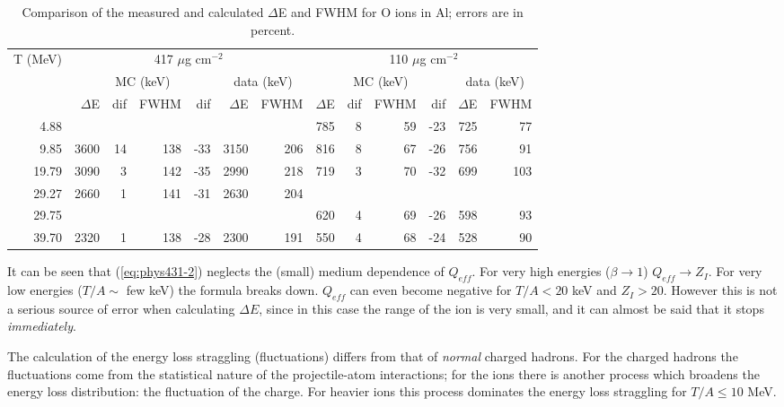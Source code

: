 \begin{table}
\begin{centering}
\begin{tabular}{|r|rr|rr|r|r|rr|rr|r|r|}
\hline
\multicolumn{1}{|c|}{T (MeV)} & \multicolumn{6}{c|}{417 $\mu$g cm$^{-2}$}
& \multicolumn{6}{c|}{110 $\mu$g cm$^{-2}$} \\[0.1cm]
& \multicolumn{4}{c|}{MC (keV)} & \multicolumn{2}{c|}{data (keV)} &
\multicolumn{4}{c|}{MC (keV)} & \multicolumn{2}{c|}{data (keV)} \\
& $\Delta$E & dif & FWHM & dif & $\Delta$E & FWHM & 
$\Delta$E & dif & FWHM & dif & $\Delta$E & FWHM \\
\hline
4.88  & &  & & & & & 785 & 8 & 59 & -23 & 725 & 77 \\
9.85 & 3600 & 14 & 138 & -33 & 3150 & 206 & 816 & 8 & 67 &  -26 & 756 & 91 \\
19.79 & 3090 & 3 & 142 & -35 & 2990 & 218 & 719 & 3 & 70 & -32 & 699 & 103 \\
29.27 & 2660 & 1 & 141 & -31 & 2630 & 204 & & & & & & \\
29.75 & & & & & & & 620 & 4 & 69 & -26 & 598 & 93 \\
39.70 & 2320 & 1 & 138 & -28 & 2300 & 191 & 550 & 4 & 68 & -24 & 528 & 90 \\
\hline
\end{tabular}
\caption{Comparison of the measured and calculated $\Delta$E and FWHM
for O ions in Al; errors are in percent.}
\end{centering}
\label{tb:phys431-2}
\end{table}

It can be seen that (\ref{eq:phys431-2}) neglects the (small) medium
dependence of $Q_{eff}$. For very high energies ($\beta \rightarrow 1$)
$Q_{eff} \rightarrow Z_{I}$. For very low energies ($T/A \sim$ few keV)
the formula breaks down. $Q_{eff}$ can even become negative for $T/A <
20$ keV and $Z_{I} > 20$. However this is not a serious source of
error when calculating $\Delta E$, since in this case the range of
the ion is very small, and it can almost be said that it stops
{\it immediately}.

The calculation of the energy loss straggling (fluctuations) differs
from that of {\it normal} charged hadrons. For the charged hadrons
the fluctuations come from the statistical nature of the 
projectile-atom interactions; for the ions there is another process which
broadens the energy loss distribution: the fluctuation of the charge.
For heavier ions this process dominates the energy loss straggling
for $T/A \leq 10$ MeV.


